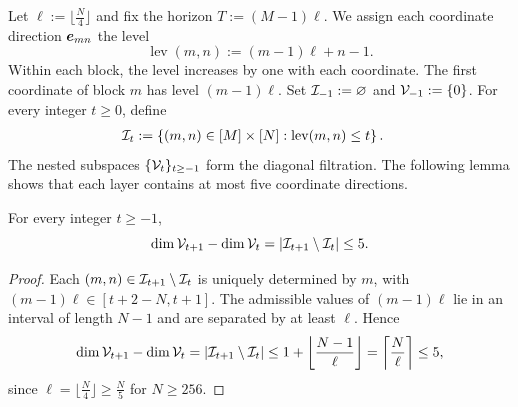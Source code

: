 {Let $\ell:=\lfloor \tfrac{N}{4}\rfloor$ and
fix the horizon $T:=(M-1)\ell$.}
We assign each coordinate direction $\bm{e}_{mn}$ the level
\[
 \operatorname{lev}(m,n):=(m-1)\ell+n-1.
\]
Within each block, the level increases by one with each
coordinate. The first coordinate of block $m$ has level
$(m-1)\ell$.
Set ${\cal I}_{-1}:=\varnothing$ and ${\cal V}_{-1}:=\{0\}$.
For every integer $t\ge0$, define
\begin{equation}
\label{newrand:filtration}
\begin{aligned}
 {\cal I}_t
 &:=
 \left\{(m,n)\in[M]\times[N]:
 \operatorname{lev}(m,n)\le t\right\}.
\end{aligned}
\end{equation}
The nested subspaces $\{{\cal V}_t\}_{t\ge-1}$ form the
diagonal filtration.
The following lemma shows that each layer contains
at most five coordinate directions.

\begin{lemma}
\label{lem:diagonal-width}
For every integer $t\ge-1$,
\[
 \dim {\cal V}_{t+1}-\dim {\cal V}_t
 =
 |{\cal I}_{t+1}\setminus {\cal I}_t|
 \le5.
\]
\end{lemma}
\begin{proof}
Each $(m,n)\in {\cal I}_{t+1}\setminus {\cal I}_t$ is uniquely
determined by $m$, with
$(m-1)\ell\in[t+2-N,t+1]$.
The admissible values of $(m-1)\ell$ lie in an interval
of length $N-1$ and are separated by at least $\ell$.  Hence
\[
 \dim {\cal V}_{t+1}-\dim {\cal V}_t
 =
 |{\cal I}_{t+1}\setminus {\cal I}_t|
 \le
 1+\left\lfloor\frac{N-1}{\ell}\right\rfloor
 =
 \left\lceil\frac N\ell\right\rceil
 \le5,
\]
since $\ell=\lfloor \tfrac{N}{4}\rfloor\ge \tfrac{N}{5}$ for $N\ge256$.
\end{proof}

